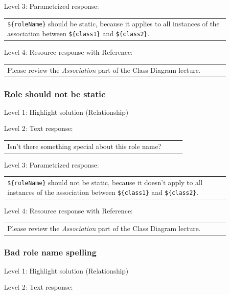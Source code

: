\noindent Level 3: Parametrized response: \medskip

\begin{tabular}{|p{0.9\linewidth}}
\verb|${roleName}| should be static, because it applies to all instances of the association between \verb|${class1}| and \verb|${class2}|.
\end{tabular} \medskip

\noindent Level 4: Resource response with Reference: \medskip

\begin{tabular}{|p{0.9\linewidth}}
Please review the \textit{Association} part of the Class Diagram lecture.
\end{tabular} \medskip


\subsubsection{Role should not be static}

\noindent Level 1: Highlight solution (Relationship) \medskip

\noindent Level 2: Text response: \medskip

\begin{tabular}{|p{0.9\linewidth}}
Isn't there something special about this role name?
\end{tabular} \medskip

\noindent Level 3: Parametrized response: \medskip

\begin{tabular}{|p{0.9\linewidth}}
\verb|${roleName}| should not be static, because it doesn't apply to all instances of the association between \verb|${class1}| and \verb|${class2}|.
\end{tabular} \medskip

\noindent Level 4: Resource response with Reference: \medskip

\begin{tabular}{|p{0.9\linewidth}}
Please review the \textit{Association} part of the Class Diagram lecture.
\end{tabular} \medskip


\subsubsection{Bad role name spelling}

\noindent Level 1: Highlight solution (Relationship) \medskip

\noindent Level 2: Text response: \medskip


